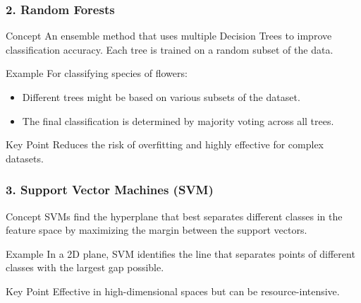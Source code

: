 \documentclass[aspectratio=169]{beamer}
\begin{document}
\begin{frame}[fragile]
    \frametitle{2. Random Forests}
    \begin{block}{Concept}
        An ensemble method that uses multiple Decision Trees to improve classification accuracy. Each tree is trained on a random subset of the data.
    \end{block}

    \begin{block}{Example}
        For classifying species of flowers:
        \begin{itemize}
            \item Different trees might be based on various subsets of the dataset.
            \item The final classification is determined by majority voting across all trees.
        \end{itemize}
    \end{block}

    \begin{block}{Key Point}
        Reduces the risk of overfitting and highly effective for complex datasets.
    \end{block}
\end{frame}

\begin{frame}[fragile]
    \frametitle{3. Support Vector Machines (SVM)}
    \begin{block}{Concept}
        SVMs find the hyperplane that best separates different classes in the feature space by maximizing the margin between the support vectors.
    \end{block}

    \begin{block}{Example}
        In a 2D plane, SVM identifies the line that separates points of different classes with the largest gap possible.
    \end{block}

    \begin{block}{Key Point}
        Effective in high-dimensional spaces but can be resource-intensive.
    \end{block}
\end{frame}
\end{document}
